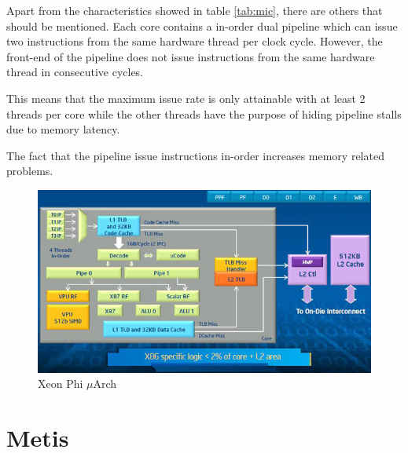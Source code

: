 \documentclass[abstract=on,9pt,twocolumn]{scrartcl}
\begin{document}

Apart from the characteristics showed in table \ref{tab:mic}, there are
others that should be mentioned. Each core contains a in-order dual
pipeline which can issue two instructions from the same hardware thread
per clock cycle. However, the front-end of the pipeline does not issue
instructions from the same hardware thread in consecutive cycles.\cite{Cepeda:PhiPerformance}

This means that the maximum issue rate is only attainable with at least
2 threads per core while the other threads have the purpose of hiding
pipeline stalls due to memory latency. %

The fact that the pipeline issue instructions in-order increases
memory related problems. %

\begin{center}
\begin{figure}[htb]
    \includegraphics[width=\columnwidth]{img/phi_arch.jpg}
    \caption{Xeon Phi $\mu$Arch}
    \label{img:phi_arch}
\end{figure}
\end{center}



\section{Metis}
\label{sec:metis}
\end{document}
